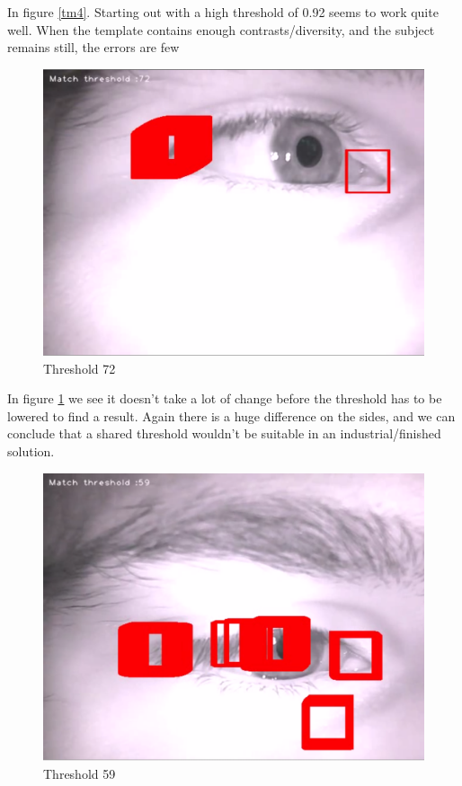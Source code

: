In figure \ref{tm4}. Starting out with a high threshold of 0.92 seems to
work quite well. When the template contains enough contrasts/diversity,
and the subject remains still, the errors are few

\begin{figure}[htbp]
\centering
\includegraphics{pics/template_matching/5.png}
\caption{Threshold 72 \label{tm5}}
\end{figure}

In figure \ref{tm5} we see it doesn't take a lot of change before the
threshold has to be lowered to find a result. Again there is a huge
difference on the sides, and we can conclude that a shared threshold
wouldn't be suitable in an industrial/finished solution.

\begin{figure}[htbp]
\centering
\includegraphics{pics/template_matching/6.png}
\caption{Threshold 59 \label{tm6}}
\end{figure}

